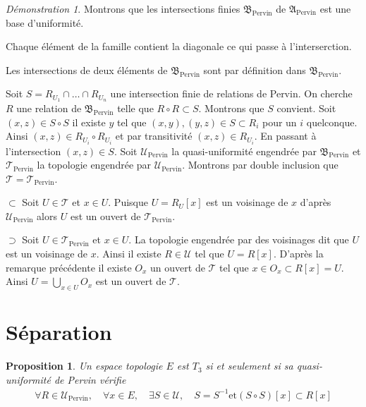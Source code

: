 \documentclass[a4paper, 11pt, french]{book}
\newenvironment{itemise}{\itemize}{\enditemize}
\theoremstyle{plain} %
\newtheorem{proposition}{Proposition}
\theoremstyle{definition} %
\theoremstyle{remark} %
\newtheorem*{demonstration}{Démonstration}
\newcommand{\1}{\mathds{1}}
\newcommand{\inv}[1]{#1^{-1}}
\newcommand{\et}{\mathrel{\mathrm{et}}}
\renewcommand{\frak}[1]{\mathfrak{#1}}
\newcommand{\scr}[1]{\mathscr{#1}}
\newcommand{\rm}[1]{\mathrm{#1}}
\begin{document}
\begin{demonstration}
	Montrons que les intersections finies $\frak{B}_\rm{Pervin}$ de $\frak{A}_\rm{Pervin}$ est une base d'uniformité.
	\begin{itemise}
		\item Chaque élément de la famille contient la diagonale ce qui passe à l'interserction.
		\item Les intersections de deux éléments de $\frak{B}_\rm{Pervin}$ sont par définition dans $\frak{B}_\rm{Pervin}$.
		\item Soit $S=R_{U_1}\cap\dots\cap R_{U_n}$ une intersection finie de relations de Pervin.
		On cherche $R$ une relation de $\frak{B}_\rm{Pervin}$ telle que $R\circ R\subset S$.
		Montrons que $S$ convient.
		Soit $(x, z)\in S\circ S$ il existe $y$ tel que $(x, y), (y, z)\in S\subset R_i$ pour un $i$ quelconque.
		Ainsi $(x, z)\in R_{U_i}\circ R_{U_i}$ et par transitivité $(x, z)\in R_{U_i}$.
		En passant à l'intersection $(x, z)\in S$.
	\end{itemise}
	Soit $\scr{U}_\rm{Pervin}$ la quasi-uniformité engendrée par $\frak{B}_\rm{Pervin}$ et $\scr{T}_\rm{Pervin}$ la topologie engendrée par $\scr{U}_\rm{Pervin}$.
	Montrons par double inclusion que $\scr{T}=\scr{T}_\rm{Pervin}$.
	\begin{itemise}
		\item[$\subset$] Soit $U\in\scr{T}$ et $x\in U$.
		Puisque $U=R_U[x]$ est un voisinage de $x$ d'après $\scr{U}_\rm{Pervin}$ alors $U$ est un ouvert de $\scr{T}_\rm{Pervin}$.
		\item[$\supset$] Soit $U\in\scr{T}_\rm{Pervin}$ et $x\in U$.
		La topologie engendrée par des voisinages dit que $U$ est un voisinage de $x$.
		Ainsi il existe $R\in\scr{U}$ tel que $U=R[x]$.
		D'après la remarque précédente il existe $O_x$ un ouvert de $\scr{T}$ tel que $x\in O_x\subset R[x]=U$.
		Ainsi $U=\bigcup_{x\in U}O_x$ est un ouvert de $\scr{T}$.
	\end{itemise}
\end{demonstration}

\section{Séparation}

\begin{proposition}
	Un espace topologie $E$ est $T_3$ si et seulement si sa quasi-uniformité de Pervin vérifie
	\begin{align*}
		\forall R\in\scr{U}_\rm{Pervin},\quad \forall x\in E,\quad \exists S\in\scr{U},\quad S=\inv{S}\et (S\circ S)[x]\subset R[x]
	\end{align*}
\end{proposition}
\end{document}
